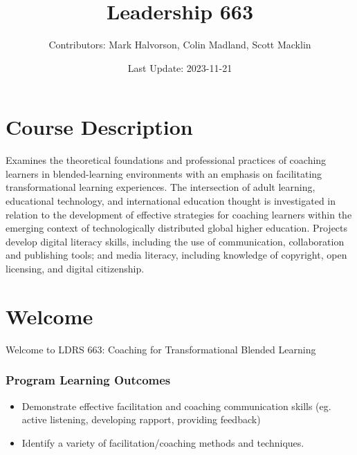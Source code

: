 \documentclass[
]{book}
\title{Leadership 663}
\author{Contributors: Mark Halvorson, Colin Madland, Scott Macklin}
\date{Last Update: 2023-11-21}
\providecommand{\tightlist}{%
  \setlength{\itemsep}{0pt}\setlength{\parskip}{0pt}}
\begin{document}
\maketitle

{
\setcounter{tocdepth}{1}
\tableofcontents
}
\hypertarget{course-description}{%
\chapter*{Course Description}\label{course-description}}

Examines the theoretical foundations and professional practices of coaching learners in blended-learning environments with an emphasis on facilitating transformational learning experiences. The intersection of adult learning, educational technology, and international education thought is investigated in relation to the development of effective strategies for coaching learners within the emerging context of technologically distributed global higher education. Projects develop digital literacy skills, including the use of communication, collaboration and publishing tools; and media literacy, including knowledge of copyright, open licensing, and digital citizenship.

\hypertarget{welcome}{%
\chapter*{Welcome}\label{welcome}}

Welcome to LDRS 663: Coaching for Transformational Blended Learning

\hypertarget{program-learning-outcomes}{%
\subsection*{Program Learning Outcomes}\label{program-learning-outcomes}}

\begin{itemize}
\tightlist
\item
  Demonstrate effective facilitation and coaching communication skills (eg. active listening, developing rapport, providing feedback)\\
\item
  Identify a variety of facilitation/coaching methods and techniques.
\end{itemize}
\end{document}
